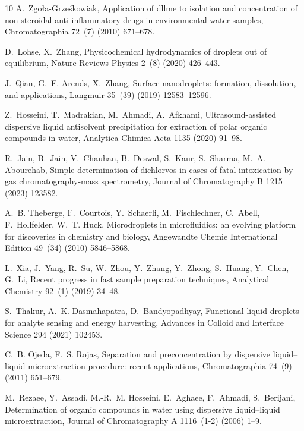 \documentclass[a4paper,fleqn]{cas-dc}
\begin{document}
\begin{sloppypar}
\begin{thebibliography}{10}
A.~Zgo{\l}a-Grze{\'s}kowiak, Application of dllme to isolation and
  concentration of non-steroidal anti-inflammatory drugs in environmental water
  samples, Chromatographia 72~(7) (2010) 671--678.

D.~Lohse, X.~Zhang, Physicochemical hydrodynamics of droplets out of
  equilibrium, Nature Reviews Physics 2~(8) (2020) 426--443.

J.~Qian, G.~F. Arends, X.~Zhang, Surface nanodroplets: formation, dissolution,
  and applications, Langmuir 35~(39) (2019) 12583--12596.

Z.~Hosseini, T.~Madrakian, M.~Ahmadi, A.~Afkhami, Ultrasound-assisted
  dispersive liquid antisolvent precipitation for extraction of polar organic
  compounds in water, Analytica Chimica Acta 1135 (2020) 91--98.

R.~Jain, B.~Jain, V.~Chauhan, B.~Deswal, S.~Kaur, S.~Sharma, M.~A. Abourehab,
  Simple determination of dichlorvos in cases of fatal intoxication by gas
  chromatography-mass spectrometry, Journal of Chromatography B 1215 (2023)
  123582.

A.~B. Theberge, F.~Courtois, Y.~Schaerli, M.~Fischlechner, C.~Abell,
  F.~Hollfelder, W.~T. Huck, Microdroplets in microfluidics: an evolving
  platform for discoveries in chemistry and biology, Angewandte Chemie
  International Edition 49~(34) (2010) 5846--5868.

L.~Xia, J.~Yang, R.~Su, W.~Zhou, Y.~Zhang, Y.~Zhong, S.~Huang, Y.~Chen, G.~Li,
  Recent progress in fast sample preparation techniques, Analytical Chemistry
  92~(1) (2019) 34--48.

S.~Thakur, A.~K. Dasmahapatra, D.~Bandyopadhyay, Functional liquid droplets for
  analyte sensing and energy harvesting, Advances in Colloid and Interface
  Science 294 (2021) 102453.

C.~B. Ojeda, F.~S. Rojas, Separation and preconcentration by dispersive
  liquid--liquid microextraction procedure: recent applications,
  Chromatographia 74~(9) (2011) 651--679.

M.~Rezaee, Y.~Assadi, M.-R.~M. Hosseini, E.~Aghaee, F.~Ahmadi, S.~Berijani,
  Determination of organic compounds in water using dispersive liquid--liquid
  microextraction, Journal of Chromatography A 1116~(1-2) (2006) 1--9.


\end{thebibliography}
\end{sloppypar}
\end{document}
